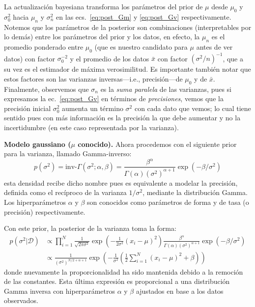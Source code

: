 \begin{remark}
	La actualización bayesiana transforma los parámetros del prior de  $\mu$ desde  $\mu_0$ y $\sigma_0^2$ hacia $\mu_n$ y $\sigma_n^2$ en las ecs.~\eqref{eq:post_Gm} y \eqref{eq:post_Gv} respectivamente. Notemos que los  parámetros de la posterior son combinaciones (interpretables por lo demás) entre los parámetros del prior y los datos, en efecto, la $\mu_n$ es el promedio ponderado entre  $\mu_0$ (que es nuestro candidato para $\mu$ antes de ver datos) con factor $\sigma_0^{-2}$ y el promedio de los datos $\bar{x}$ con factor $(\sigma^{2}/n)^{-1}$, que a su vez es el estimador de máxima verosimilitud. Es importante también notar que  estos  factores son las varianzas inversas---i.e., precisión---de $\mu_0$ y de $\bar{x}$. Finalmente, observemos que $\sigma_n$ es la \emph{suma paralela} de las varianzas, pues  si expresamos la ec.~\eqref{eq:post_Gv} en términos de \emph{precisiones}, vemos que la precisión inicial $\sigma_0^2$ aumenta un término $\sigma^2$ con cada dato que vemos; lo cual tiene sentido pues con más información es la precisión la que debe aumentar y no la incertidumbre (en este caso representada por la varianza).
\end{remark}
\begin{example} \textbf{Modelo gaussiano ($\mu$ conocido).} Ahora procedemos con el siguiente prior para la varianza, llamado Gamma-inverso:
 \begin{equation}
 	p(\sigma^2)= \text{inv-}\Gamma(\sigma^2;\alpha,\beta) = \frac{\beta^\alpha}{\Gamma(\alpha) (\sigma^2)^{\alpha+1}}\exp(-\beta/\sigma^2)
 \end{equation}
 esta densidad recibe dicho nombre pues es equivalente a modelar la precisión, definida como el recíproco de la varianza $1/\sigma^2$, mediante la distribución Gamma. Los hiperparámetros $\alpha$ y $\beta$ son conocidos como parámetros de forma y de tasa (o precisión) respectivamente. 

 Con este prior, la posterior de la varianza toma la forma:
 \begin{align}
 	p(\sigma^2|\mathcal{D}) &\propto \prod_{i=1}^N \frac{1}{\sqrt{2\pi\sigma^2}}\exp\left(-\frac{1}{2\sigma^2}(x_i-\mu)^2\right) \frac{\beta^\alpha}{\Gamma(\alpha) (\sigma^2)^{\alpha+1}}\exp(-\beta/\sigma^2)\\
 	&\propto  \frac{1}{(\sigma^2)^{N/2+\alpha+1}}\exp\left(-\frac{1}{\sigma^2}\left(\frac{1}{2}\sum_{i=1}^N(x_i-\mu)^2 +\beta\right) \right)\nonumber
 \end{align} 
 donde nuevamente la proporcionalidad ha sido mantenida debido a la remoción de las constantes. Esta última expresión es proporcional a una distribución Gamma inversa con hiperparámetros $\alpha$ y $\beta$ ajustados en base a los datos observados. 


\end{example}


